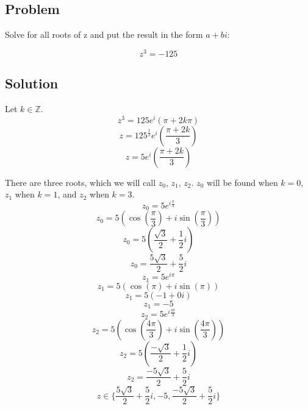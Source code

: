 \documentclass[12pt]{article}
\newcommand{\integer}{\mathbb{Z}}
\begin{document}
\subsection{Problem}

Solve for all roots of z and put the result in the form $a+bi$:

\begin{equation}
	z^3=-125
\end{equation}
\subsection{Solution}
Let $k\in\integer$.
\begin{equation}
	z^3=125e^i(\pi+2k\pi)
\end{equation}
\begin{equation}
	z=125^{\frac{1}{3}}e^i(\frac{\pi+2k}{3})
\end{equation}
\begin{equation}
	z=5e^i(\frac{\pi+2k}{3})
\end{equation}

There are three roots, which we will call $z_0$, $z_1$, $z_2$.  $z_0$ will be found when $k=0$, $z_1$ when $k=1$, and $z_2$ when $k=3$.
\begin{equation}
	z_0=5e^{i\frac{\pi}{3}}
\end{equation}
\begin{equation}
	z_0=5(\cos(\frac{\pi}{3})+i\sin(\frac{\pi}{3}))
\end{equation}
\begin{equation}
	z_0=5(\frac{\sqrt{3}}{2}+\frac{1}{2}i)
\end{equation}
\begin{equation}
	z_0=\frac{5\sqrt{3}}{2}+\frac{5}{2}i
\end{equation}
\begin{equation}
	z_1=5e^{i\pi}
\end{equation}
\begin{equation}
	z_1=5(\cos(\pi)+i\sin(\pi))
\end{equation}
\begin{equation}
	z_1=5(-1+0i)
\end{equation}
\begin{equation}
	z_1=-5
\end{equation}
\begin{equation}
	z_2=5e^{i\frac{4\pi}{3}}
\end{equation}
\begin{equation}
	z_2=5(\cos(\frac{4\pi}{3})+i\sin(\frac{4\pi}{3}))
\end{equation}
\begin{equation}
	z_2=5(\frac{-\sqrt{3}}{2}+\frac{1}{2}i)
\end{equation}
\begin{equation}
	z_2=\frac{-5\sqrt{3}}{2}+\frac{5}{2}i
\end{equation}
\begin{equation}
	z\in\{\frac{5\sqrt{3}}{2}+\frac{5}{2}i,-5,\frac{-5\sqrt{3}}{2}+\frac{5}{2}i\}
\end{equation}
\end{document}
